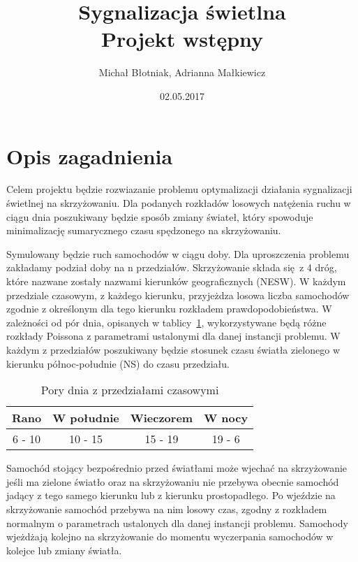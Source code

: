 \documentclass[a4paper]{article}
\title {
  Sygnalizacja świetlna
  \\ Projekt wstępny
}
\date{02.05.2017}
\author{Michał Błotniak, Adrianna Małkiewicz}
\begin{document}
\maketitle

\justify

\section{Opis zagadnienia}

Celem projektu będzie rozwiazanie problemu optymalizacji działania sygnalizacji
świetlnej na skrzyżowaniu. Dla podanych rozkładów losowych natężenia ruchu
w ciągu dnia poszukiwany będzie sposób zmiany świateł, który spowoduje
minimalizację sumarycznego czasu spędzonego na skrzyżowaniu.

Symulowany będzie ruch samochodów w ciągu doby. Dla uproszczenia problemu
zakładamy podział doby na n przedziałów. Skrzyżowanie składa się z 4 dróg, które
nazwane zostały nazwami kierunków geograficznych (NESW). W każdym przedziale
czasowym, z każdego kierunku, przyjeżdza losowa liczba samochodów zgodnie
z określonym dla tego kierunku rozkładem prawdopodobieństwa. W zależności od
pór dnia, opisanych w tablicy~\ref{tab:hours}, wykorzystywane będą różne
rozkłady Poissona z parametrami ustalonymi dla danej instancji problemu.
W każdym z przedziałów poszukiwany będzie stosunek czasu światła zielonego
w kierunku północ-południe (NS) do czasu przedziału.

\begin{table}[ht]
    \centering
    \begin{tabular}{| c | c | c | c |}
        \hline
        Rano & W południe & Wieczorem & W nocy \\ \hline
        6 - 10 & 10 - 15 & 15 - 19 & 19 - 6 \\ \hline
    \end{tabular}
    \caption{Pory dnia z przedziałami czasowymi\label{tab:hours}}
\end{table}

Samochód stojący bezpośrednio przed światłami może wjechać na skrzyżowanie
jeśli ma zielone światło oraz na skrzyżowaniu nie przebywa obecnie samochód
jadący z tego samego kierunku lub z kierunku prostopadłego. Po wjeździe na
skrzyżowanie samochód przebywa na nim losowy czas, zgodny z rozkładem normalnym
o parametrach ustalonych dla danej instancji problemu. Samochody wjeżdżają
kolejno na skrzyżowanie do momentu wyczerpania samochodów w kolejce lub zmiany
światła.
\end{document}
